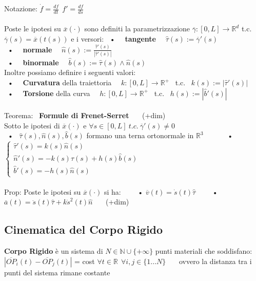 \documentclass{article}
\begin{document}
Notazione: $\dot{f}=\frac{df}{dt} \ \ f'=\frac{df}{ds}$ \\ \\
%
%
%
Poste le ipotesi su $\overline{x}(\cdot)$ sono definiti la parametrizzazione $\overline{\gamma}:[0,L]\rightarrow\mathbb{R}^d$ t.c. $\overline{\gamma}(s)=\overline{x}(t(s))$ e i versori:
\ • \ \ \textbf{tangente} \ \ $\hat{\tau}(s) := \overline{\gamma}'(s) $ \\
\ • \ \ \textbf{normale} \ \ $\hat{n}(s):=\frac{\hat{\tau}'(s)}{|\hat{\tau}'(s)|}$\\
\ • \ \ \textbf{binormale} \ \ $\hat{b}(s):=\hat{\tau}(s)\wedge\hat{n}(s)$ \\
Inoltre possiamo definire i seguenti valori: \\
\ • \ \ \textbf{Curvatura} della traiettoria \ \ $k:[0,L]\rightarrow\mathbb{R}^+$ \ t.c. \ $k(s) := |\hat{\tau}'(s)|$\\
\ • \ \ \textbf{Torsione} della curva \ \  $h:[0,L]\rightarrow\mathbb{R}^+$ \ t.c. \ $h(s) := |\hat{b}'(s)|$ \\ \\
%
%
%
Teorema: \ \textbf{Formule di Frenet-Serret} \ \ \ (+dim)\\
\phantom{\ } Sotto le ipotesi di $\overline{x}(\cdot)$ e $\forall s \in [0,L] \ t.c. \ \overline{\gamma}'(s)\neq 0$ \\
\ • \ $\hat{\tau}(s), \hat{n}(s), \hat{b}(s)$ formano una terna ortonormale in $\mathbb{R}^3$ \ \ \ \ \ \ • \
$\begin{cases}
\hat{\tau}'(s)=k(s)\hat{n}(s) \\
\hat{n}'(s)=-k(s)\hat{\tau}(s)+h(s)\hat{b}(s)\\
\hat{b}'(s)=-h(s)\hat{n}(s)
\end{cases}$ \\ \\
Prop: Poste le ipotesi su $\overline{x}(\cdot)$ si ha: \ \ \ \
• $\overline{v}(t)=\dot{s}(t)\hat{\tau}$ \ \ \ \
• $\overline{a}(t)=\ddot{s}(t)\hat{\tau}+k\dot{s}^2(t)\hat{n}$ \ \ \ (+dim)\\




\subsection{Cinematica del Corpo Rigido}
%
\textbf{Corpo Rigido} è un sistema di $N\in\mathbb{N}\cup\{+\infty\}$ punti materiali che soddisfano: \\ $|\overline{OP}_i(t) - \overline{OP}_j(t)|$ = cost   $\forall t \in \mathbb{R} \ \ \forall i,j \in \{1...N\}$ 
\ \ \ ovvero la distanza tra i punti del sistema rimane costante
\end{document}
